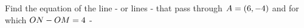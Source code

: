 
%
%
%
%      
% 
% 
%   



\question[3] Find the equation of the line - or lines - that pass through $A = (6, -4)$ 
and for which $ON - OM = 4$ - \asif

